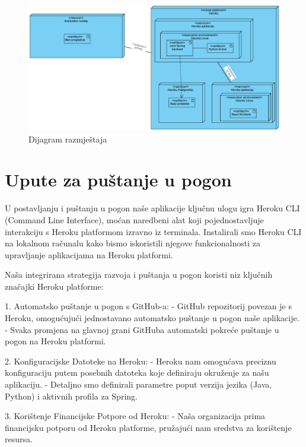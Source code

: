             \begin{figure}[H]
             \centering
             \includegraphics[width=1\linewidth]{slike/Dijagram razmjestaja.png}
             \caption{Dijagram razmještaja}
             \end{figure}
			\eject
		
		\section{Upute za puštanje u pogon}
		
		
U postavljanju i puštanju u pogon naše aplikacije ključnu ulogu igra Heroku CLI (Command Line Interface), moćan naredbeni alat koji pojednostavljuje interakciju s Heroku platformom izravno iz terminala. Instalirali smo Heroku CLI na lokalnom računalu kako bismo iskoristili njegove funkcionalnosti za upravljanje aplikacijama na Heroku platformi.

Naša integrirana strategija razvoja i puštanja u pogon koristi niz ključnih značajki Heroku platforme:

1. Automatsko puštanje u pogon s GitHub-a:
\newline- GitHub repozitorij povezan je s Heroku, omogućujući jednostavano automatsko puštanje u pogon naše aplikacije.
\newline- Svaka promjena na glavnoj grani GitHuba automatski pokreće puštanje u pogon na Heroku platformi.

2. Konfiguracijske Datoteke na Heroku:
\newline- Heroku nam omogućava preciznu konfiguraciju putem posebnih datoteka koje definiraju okruženje za našu aplikaciju.
\newline- Detaljno smo definirali parametre poput verzija jezika (Java, Python) i aktivnih profila za Spring.

3. Korištenje Financijske Potpore od Heroku:
\newline- Naša organizacija prima financijsku potporu od Heroku platforme, pružajući nam sredstva za korištenje resursa.


